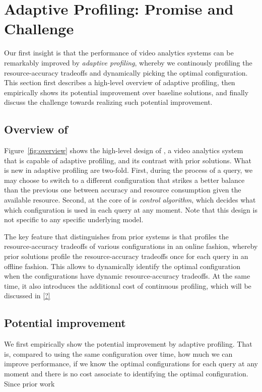 \section{Adaptive Profiling: Promise and Challenge}

Our first insight is that the performance of video analytics systems
can be remarkably improved by {\em adaptive profiling}, whereby we 
continously profiling the resource-accuracy tradeoffs and dynamically
picking the optimal configuration.
This section first describes a high-level overview of adaptive 
profiling, then empirically shows its potential improvement over 
baseline solutions, and finally discuss the challenge towards 
realizing such potential improvement.

\subsection{Overview of \name}

Figure~\ref{fig:overview} shows the high-level design of {\em \name},
a video analytics system that is capable of adaptive profiling, and 
its contrast with prior solutions.
What is new in adaptive profiling are two-fold. 
First, during the process of a query, we may choose to switch to a
different configuration that strikes a better balance than the 
previous one between accuracy and resource consumption given the 
available resource. 
Second, at the core of \name is {\em \name control algorithm}, which 
decides what which configuration is used in each query at any moment.
Note that this design is not specific to any specific underlying \nn 
model.

The key feature that distinguishes \name from prior systems is that
\name profiles the resource-accuracy tradeoffs of various 
configurations in an online fashion, whereby prior solutions profile
the resource-accuracy tradeoffs once for each query in an offline 
fashion.
This allows \name to dynamically identify the optimal configuration
when the configurations have dynamic resource-accuracy tradeoffs.
At the same time, it also introduces the additional cost of 
continuous profiling, which will be discussed in \Section\ref{?}

\subsection{Potential improvement}
We first empirically show the potential improvement by adaptive 
profiling.
That is, compared to using the same configuration over time, how much
we can improve performance, if we know the optimal configurations for
each query at any moment and there is no cost associate to 
identifying the optimal configuration.
Since prior work 

